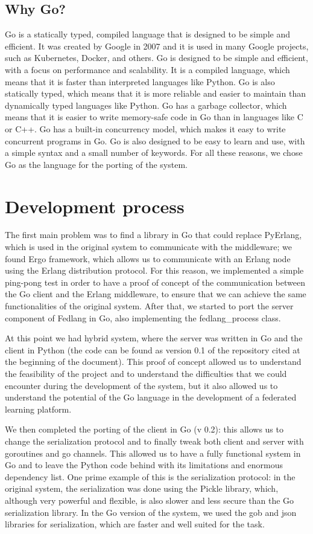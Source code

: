 \subsection{Why Go?}
Go is a statically typed, compiled language that is designed to be simple and efficient. It was created by Google in 2007 and it is used in many Google projects, such as Kubernetes, Docker, and others. Go is designed to be simple and efficient, with a focus on performance and scalability. It is a compiled language, which means that it is faster than interpreted languages like Python. Go is also statically typed, which means that it is more reliable and easier to maintain than dynamically typed languages like Python. Go has a garbage collector, which means that it is easier to write memory-safe code in Go than in languages like C or C++. Go has a built-in concurrency model, which makes it easy to write concurrent programs in Go. Go is also designed to be easy to learn and use, with a simple syntax and a small number of keywords. For all these reasons, we chose Go as the language for the porting of the system.

\section{Development process}
The first main problem was to find a library in Go that could replace PyErlang, which is used in the original system to communicate with the middleware; we found Ergo framework, which allows us to communicate with an Erlang node using the Erlang distribution protocol.
For this reason, we implemented a simple ping-pong test in order to have a proof of concept of the communication between the Go client and the Erlang middleware, to ensure that we can achieve the same functionalities of the original system. After that, we started to port the server component of Fedlang in Go, also implementing the fedlang\_process class. 

At this point we had hybrid system, where the server was written in Go and the client in Python (the code can be found as version 0.1 of the repository cited at the beginning of the document). This proof of concept allowed us to understand the feasibility of the project and to understand the difficulties that we could encounter during the development of the system, but it also allowed us to understand the potential of the Go language in the development of a federated learning platform.

We then completed the porting of the client in Go (v 0.2): this allows us to change the serialization protocol and to finally tweak both client and server with goroutines and go channels. This allowed us to have a fully functional system in Go and to leave the Python code behind with its limitations and enormous dependency list. One prime example of this is the serialization protocol: in the original system, the serialization was done using the Pickle library, which, although very powerful and flexible, is also slower and less secure than the Go serialization library. In the Go version of the system, we used the gob and json libraries for serialization, which are faster and well suited for the task.

